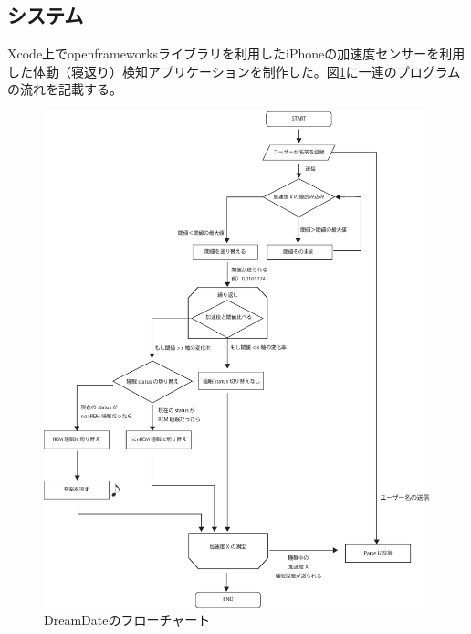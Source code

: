 \subsection{システム}
Xcode上でopenframeworksライブラリを利用したiPhoneの加速度センサーを利用した体動（寝返り）検知アプリケーションを制作した。図\ref{system}に一連のプログラムの流れを記載する。\\
\begin{figure}[htbp]
\begin{center}
\includegraphics[width=15cm]{eps/system.eps}
\caption{DreamDateのフローチャート}
\label{system}
\end{center}
\end{figure}
